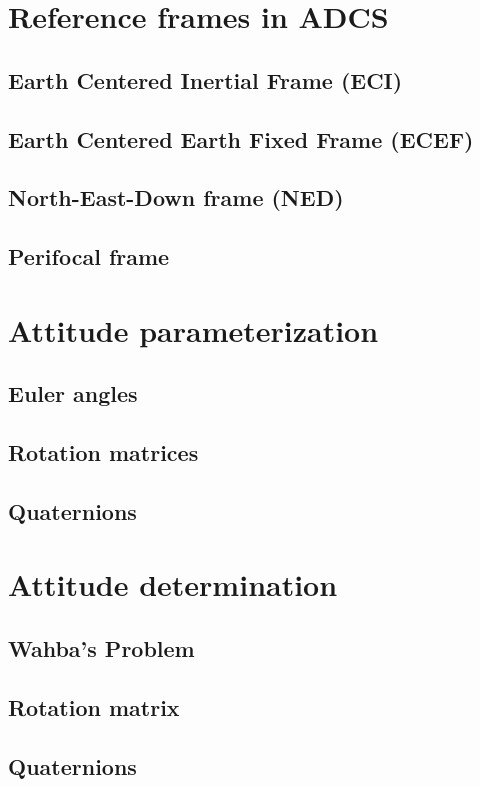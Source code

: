 \documentclass{article}
\begin{document}
\section{Reference frames in ADCS}
\subsection{Earth Centered Inertial Frame (ECI)}
\subsection{Earth Centered Earth Fixed Frame (ECEF)}
\subsection{North-East-Down frame (NED)}
\subsection{Perifocal frame}

\section{Attitude parameterization}
\subsection{Euler angles}
\subsection{Rotation matrices}
\subsection{Quaternions}

\section{Attitude determination}
\subsection{Wahba's Problem}
\subsection{Rotation matrix}
\subsection{Quaternions}
\end{document}
